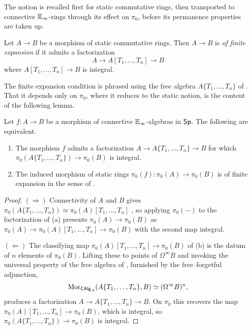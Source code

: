 The notion is recalled first for static commutative rings, then transported to connective $\mathbb{E}_{\infty}$-rings through its effect on $\pi_{0}$, before its permanence properties are taken up.
\begin{definition}\label{def: static finite expansion}
    Let $A\to B$ be a morphism of static commutative rings. Then $A\to B$ is \emph{of finite expansion} if it admits a factorization
    $$A\to A[T_{1},\dots,T_{n}]\to B$$
    where $A[T_{1},\dots,T_{n}]\to B$ is integral.
\end{definition}
The finite expansion condition is phrased using the free algebra $A\{T_{1},\dots,T_{n}\}$ of . That it depends only on $\pi_{0}$, where it reduces to the static notion, is the content of the following lemma.
\begin{lemma}\label{lem: finite expansion static detection}
    Let $f:A\to B$ be a morphism of connective $\mathbb{E}_{\infty}$-algebras in $\mathsf{Sp}$. The following are equivalent.
    \begin{enumerate}[label=(\alph*)]
        \item The morphism $f$ admits a factorization $A\to A\{T_{1},\dots,T_{n}\}\to B$ for which $\pi_{0}(A\{T_{1},\dots,T_{n}\})\to\pi_{0}(B)$ is integral.
        \item The induced morphism of static rings $\pi_{0}(f):\pi_{0}(A)\to\pi_{0}(B)$ is of finite expansion in the sense of .
    \end{enumerate}
\end{lemma}
\begin{proof}
    $(\Rightarrow)$ Connectivity of $A$ and $B$ gives $\pi_{0}(A\{T_{1},\dots,T_{n}\})\simeq\pi_{0}(A)[T_{1},\dots,T_{n}]$ \cite[Not. B.1.1.2]{SAG}, so applying $\pi_{0}(-)$ to the factorization of (a) presents $\pi_{0}(A)\to\pi_{0}(B)$ as $\pi_{0}(A)\to\pi_{0}(A)[T_{1},\dots,T_{n}]\to\pi_{0}(B)$ with the second map integral.

    $(\Leftarrow)$ The classifying map $\pi_{0}(A)[T_{1},\dots,T_{n}]\to\pi_{0}(B)$ of (b) is the datum of $n$ elements of $\pi_{0}(B)$. Lifting these to points of $\Omega^{\infty} B$ and invoking the universal property of the free algebra of , furnished by the free--forgetful adjunction, 
    $$\mathrm{Mor}_{\mathsf{CAlg}_{A}}(A\{T_{1},\dots,T_{n}\},B)\simeq(\Omega^{\infty} B)^{n},$$ 
    produces a factorization $A\to A\{T_{1},\dots,T_{n}\}\to B$. On $\pi_{0}$ this recovers the map $\pi_{0}(A)[T_{1},\dots,T_{n}]\to\pi_{0}(B)$, which is integral, so $\pi_{0}(A\{T_{1},\dots,T_{n}\})\to\pi_{0}(B)$ is integral.
\end{proof}
